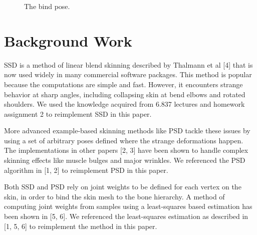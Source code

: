 \documentclass[10pt,twocolumn,letterpaper]{article}
\begin{document}
\begin{figure}[t]
\begin{center}
\end{center}
   \caption{The bind pose.}
\label{fig:long}
\label{fig:onecol}
\end{figure}

\section{Background Work}

SSD is a method of linear blend skinning described by Thalmann et al [4] that is now used widely in many commercial software packages. This method is popular because the computations are simple and fast. However, it encounters strange behavior at sharp angles, including collapsing skin at bend elbows and rotated shoulders. We used the knowledge acquired from 6.837 lectures and homework assignment 2 to reimplement SSD in this paper.

More advanced example-based skinning methods like PSD tackle these issues by using a set of arbitrary poses defined where the strange deformations happen. The implementations in other papers [2, 3] have been shown to handle complex skinning effects like muscle bulges and major wrinkles. We referenced the PSD algorithm in [1, 2] to reimplement PSD in this paper.

Both SSD and PSD rely on joint weights to be defined for each vertex on the skin, in order to bind the skin mesh to the bone hierarchy. A method of computing joint weights from samples using a least-squares based estimation has been shown in [5, 6]. We referenced the least-squares estimation as described in [1, 5, 6] to reimplement the method in this paper.

\end{document}
